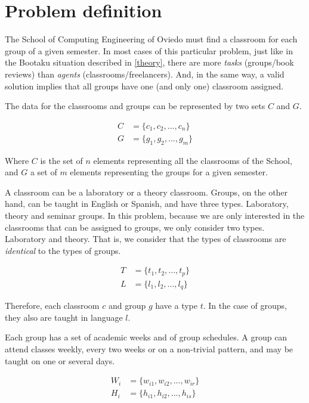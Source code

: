\renewcommand{\documentname}{Problem definition}

\chapter{Problem definition}\label{problem-definition}

The School of Computing Engineering of Oviedo must find a classroom for each group of a given semester. In most cases of this particular problem, just like in the Bootaku situation described in \ref{theory}, there are more \textit{tasks} (groups/book reviews) than \textit{agents} (classrooms/freelancers). And, in the same way, a valid solution implies that all groups have one (and only one) classroom assigned.

The data for the classrooms and groups can be represented by two sets $C$ and $G$. 

\begin{align}
    C &= \{ c_{1}, c_{2}, ..., c_{n} \}\\
    G &= \{ g_{1}, g_{2}, ..., g_{m} \}
\end{align}

Where $C$ is the set of $n$ elements representing all the classrooms of the School, and $G$ a set of $m$ elements representing the groups for a given semester.

A classroom can be a laboratory or a theory classroom. Groups, on the other hand, can be taught in English or Spanish, and have three types. Laboratory, theory and seminar groups. In this problem, because we are only interested in the classrooms that can be assigned to groups, we only consider two types. Laboratory and theory. That is, we consider that the types of classrooms are \textit{identical} to the types of groups.

\begin{align}
    T &= \{ t_{1}, t_{2}, ..., t_{p} \}\\
    L &= \{ l_{1}, l_{2}, ..., l_{q} \}
\end{align}

Therefore, each classroom $c$ and group $g$ have a type $t$. In the case of groups, they also are taught in language $l$.

Each group has a set of academic weeks and of group schedules. A group can attend classes weekly, every two weeks or on a non-trivial pattern, and may be taught on one or several days.

\begin{align}
    W_{i} &= \{ w_{i1}, w_{i2}, ..., w_{ir} \}\\
    H_{i} &= \{ h_{i1}, h_{i2}, ..., h_{is} \}
\end{align}

